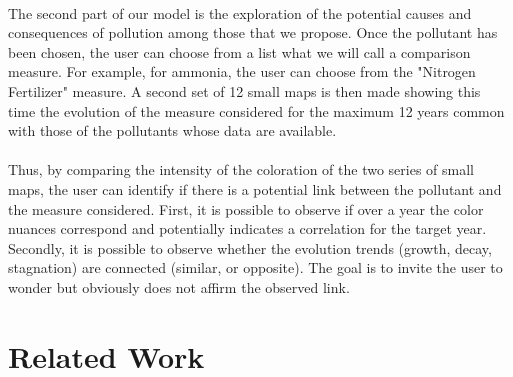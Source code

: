 \documentclass[preprint,journal]{vgtc}       %
\begin{document}
\paragraph{}
The second part of our model is the exploration of the potential causes and consequences of pollution among those that we propose. Once the pollutant has been chosen, the user can choose from a list what we will call a comparison measure. For example, for ammonia, the user can choose from the "Nitrogen Fertilizer" measure. A second set of 12 small maps is then made showing this time the evolution of the measure considered for the maximum 12 years common with those of the pollutants whose data are available.

\paragraph{}
Thus, by comparing the intensity of the coloration of the two series of small maps, the user can identify if there is a potential link between the pollutant and the measure considered. First, it is possible to observe if over a year the color nuances correspond and potentially indicates a correlation for the target year. Secondly, it is possible to observe whether the evolution trends (growth, decay, stagnation) are connected (similar, or opposite). The goal is to invite the user to wonder but obviously does not affirm the observed link.




\section{Related Work}
\end{document}
